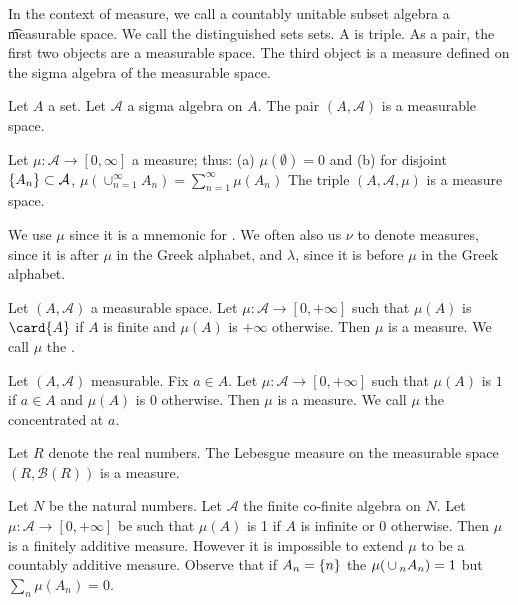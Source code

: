 In the context of measure,
we call a countably unitable subset algebra
a \t{measurable space}.
We call the distinguished sets
sets.
A
is triple.
As a pair, the first two
objects are a measurable space.
The third object is a measure defined
on the sigma algebra of the measurable space.


Let $A$ a set.
Let $\mathcal{A}$ a sigma algebra on $A$.
The pair $(A, \mathcal{A})$ is a measurable space.

Let $\mu: \mathcal{A} \to [0, \infty]$ a measure;
thus:
(a) $\mu(\emptyset) = 0$ and
(b) for disjoint $\{A_n\} \subset \mathcal{A}$,
$\mu(\cup_{n = 1}^{\infty} A_n)
  = \sum_{n = 1}^{\infty} \mu(A_n)$
The triple $(A, \mathcal{A}, \mu)$ is a
measure space.

We use $\mu$ since it
is a mnemonic for .
We often also us
$\nu$ to denote measures,
since it is after
$\mu$ in the Greek alphabet,
and $\lambda$, since
it is before
$\mu$ in the Greek alphabet.


\begin{expl}
Let $(A, \mathcal{A})$ a measurable space.
Let $\mu: \mathcal{A} \to [0, +\infty]$ such that
$\mu(A)$ is $\card{A}$ if $A$ is finite
and $\mu(A)$ is $+\infty$ otherwise.
Then $\mu$ is a measure.
We call $\mu$ the
.
\end{expl}

\begin{expl}
Let $(A, \mathcal{A})$ measurable.
Fix $a \in A$.
Let $\mu: \mathcal{A} \to [0, +\infty]$ such
that $\mu(A)$ is $1$ if $a \in A$ and
$\mu(A)$ is $0$ otherwise.
Then $\mu$ is a measure.
We call $\mu$ the
concentrated at $a$.
\end{expl}

\begin{expl}
Let $R$ denote the real numbers.
The Lebesgue measure on the measurable
space $(R, \mathcal{B}(R))$ is a measure.
\end{expl}

\begin{expl}
Let $N$ be the natural numbers.
Let $\mathcal{A}$ the finite
co-finite algebra on $N$.
Let $\mu: \mathcal{A} \to [0, +\infty]$
be such that $\mu(A)$ is 1 if
$A$ is infinite or 0 otherwise.
Then $\mu$ is a finitely additive measure.
However it is impossible to extend
$\mu$ to be a countably additive measure.
Observe that if $A_n = \{n\}$ the
$\mu(\,\cup\,_{n} A_n) = 1$ but
$\sum_{n} \mu(A_n) = 0$.
\end{expl}

